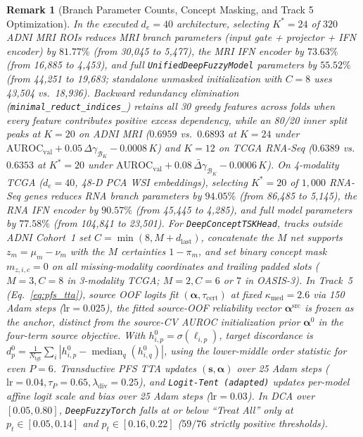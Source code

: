\documentclass[10pt,twocolumn]{article}
\newtheorem{remark}{Remark}
\begin{document}
\begin{remark}[Branch Parameter Counts, Concept Masking, and Track 5 Optimization]
\label{rem:arch_details}
In the executed $d_e=40$ architecture, selecting $K^*=24$ of $320$ ADNI MRI ROIs reduces MRI
branch parameters (input gate + projector + IFN encoder) by $81.77\%$ (from 30,045 to 5,477),
the MRI IFN encoder by $73.63\%$ (from 16,885 to 4,453), and full
\texttt{UnifiedDeepFuzzyModel} parameters by $55.52\%$ (from 44,251 to 19,683; standalone
unmasked initialization with $C=8$ uses 43,504 vs.\ 18,936). Backward redundancy elimination
(\texttt{minimal\_reduct\_indices\_}) retains all 30 greedy features across folds when every
feature contributes positive excess dependency, while an 80/20 inner split peaks at $K=20$ on
ADNI MRI ($0.6959$ vs.\ $0.6893$ at $K=24$ under $\text{AUROC}_{\text{val}} +
0.05\,\Delta\gamma_{\mathcal{B}_K} - 0.0008\,K$) and $K=12$ on TCGA RNA-Seq ($0.6389$ vs.\
$0.6353$ at $K^*=20$ under $\text{AUROC}_{\text{val}} +
0.08\,\widetilde{\Delta\gamma}_{\mathcal{B}_K} - 0.0006\,K$). On 4-modality TCGA ($d_e=40$,
48-D PCA WSI embeddings), selecting $K^*=20$ of $1,000$ RNA-Seq genes reduces RNA branch
parameters by $94.05\%$ (from 86,485 to 5,145), the RNA IFN encoder by $90.57\%$ (from 45,445
to 4,285), and full model parameters by $77.58\%$ (from 104,841 to 23,501). For
\texttt{DeepConceptTSKHead}, tracks outside ADNI Cohort~1 set $C = \min(8, M +
d_{\text{last}})$, concatenate the $M$ net supports $z_m = \mu_m - \nu_m$ with the $M$
certainties $1 - \pi_m$, and set binary concept mask $m_{z,i,c}=0$ on all missing-modality
coordinates and trailing padded slots ($M=3, C=8$ in 3-modality TCGA; $M=2, C=6$ or $7$ in
OASIS-3). In Track~5 (Eq.~\eqref{eq:pfs_tta}), source OOF logits fit $(\bm{\alpha},
\tau_{\text{cert}})$ at fixed $\kappa_{\text{med}}=2.6$ via 150 Adam steps ($\text{lr}=0.025$),
the fitted source-OOF reliability vector $\bm{\alpha}^{\text{src}}$ is frozen as the
anchor, distinct from the source-CV AUROC initialization prior $\bm{\alpha}^0$ in the
four-term source objective. With $h_{i,p}^0=\sigma(\ell_{i,p})$, target discordance is
$d_p^0=\frac{1}{N_{\text{tgt}}}\sum_i|h_{i,p}^0-
\operatorname{median}_q(h_{i,q}^0)|$, using the lower-middle order statistic for even $P=6$.
Transductive PFS TTA updates $(\bm{s}, \bm{\alpha})$ over 25 Adam steps ($\text{lr}=0.04,
\tau_P=0.65, \lambda_{\text{div}}=0.25$), and \texttt{Logit-Tent (adapted)} updates per-model
affine logit scale and bias over 25 Adam steps ($\text{lr}=0.03$). In DCA over $[0.05, 0.80]$,
\texttt{DeepFuzzyTorch} falls at or below ``Treat All'' only at $p_t \in [0.05, 0.14]$ and $p_t
\in [0.16, 0.22]$ ($59/76$ strictly positive thresholds).
\end{remark}
\end{document}
